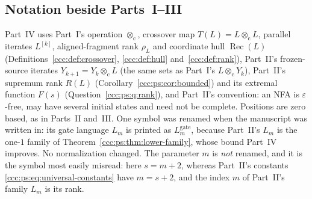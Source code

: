 \documentclass[11pt,letterpaper]{article}
\theoremstyle{definition}
\theoremstyle{remark}
\newcommand{\eps}{\varepsilon}
\newcommand{\rec}{\operatorname{Rec}}
\newcommand{\cut}{\otimes_{\mathrm c}}
\newcommand{\gen}[2]{#1^{[#2]}}
\newcommand{\rank}{\rho}
\newcommand{\Lgate}[1]{L^{\mathrm{gate}}_{#1}}
\begin{document}
\subsection{Notation beside Parts~I--III}\label{ccc:qr:sec:notation}

Part~IV uses Part~I's operation $\cut$, crossover map $T(L)=L\cut L$,
parallel iterates $\gen Lk$, aligned-fragment rank $\rank_L$ and coordinate
hull $\rec(L)$ (Definitions~\ref{ccc:def:crossover}, \ref{ccc:def:hull}
and~\ref{ccc:def:rank}), Part~II's frozen-source iterates
$Y_{k+1}=Y_k\cut L$ (the same sets as Part~I's $L\cut Y_k$), Part~II's
supremum rank $R(L)$ (Corollary~\ref{ccc:ps:cor:bounded}) and its extremal
function $F(s)$ (Question~\ref{ccc:ps:q:rank}), and Part~II's convention: an
NFA is $\eps$-free, may have several initial states and need not be
complete. Positions are zero based, as in Parts~II and~III. One symbol was
renamed when the manuscript was written in: its gate language $L_m$ is
printed as $\Lgate m$, because Part~II's $L_m$ is the one-$1$ family of
Theorem~\ref{ccc:ps:thm:lower-family}, whose bound Part~IV improves. No
normalization changed. The parameter $m$ is \emph{not} renamed, and it is
the symbol most easily misread: here $s=m+2$, whereas Part~II's constants
\eqref{ccc:ps:eq:universal-constants} have $m=s+2$, and the index $m$ of
Part~II's family $L_m$ is its rank.
\end{document}
